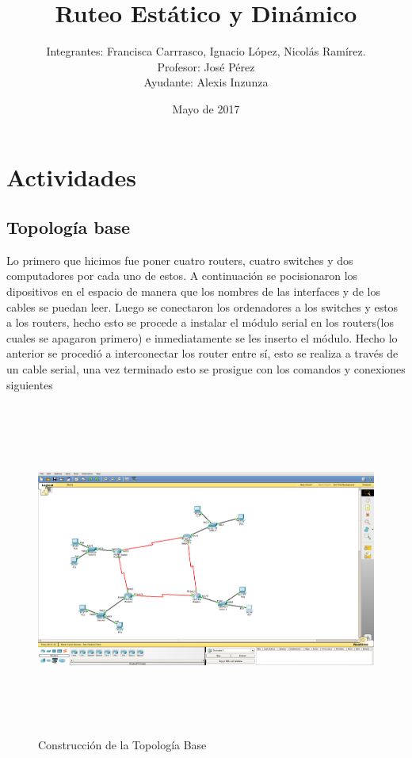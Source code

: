 \documentclass{udpreport}
\title{Ruteo Estático y Dinámico}
\author{Integrantes: Francisca Carrrasco, Ignacio López, Nicolás Ramírez.\\Profesor: José Pérez
\\Ayudante: Alexis Inzunza}
\date{Mayo de 2017}
\begin{document}
\maketitle
\tableofcontents
\listoffigures
\chapter{Actividades}
	\section{Topología base}
	Lo primero que hicimos fue poner cuatro routers, cuatro switches y dos computadores por cada uno de estos.
	 A continuación se pocisionaron los dipositivos en el espacio de manera que los nombres de las interfaces y de los cables se puedan leer. Luego se conectaron los ordenadores a los switches y estos a los
	routers, hecho esto se procede a instalar el módulo serial en los routers(los cuales se apagaron primero) e inmediatamente se les inserto el módulo. Hecho lo anterior se procedió a interconectar los router entre sí, esto se realiza  a través de un cable serial, una vez terminado esto se prosigue con los comandos y conexiones siguientes\\
	\begin{figure}[h]
	\centering
	\includegraphics[width=16cm, height=11cm]{Topologia_Base.png}
	\caption{Construcción de la Topología Base}
	\end{figure}
	\newpage
\end{document}

